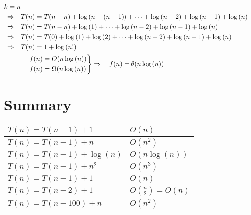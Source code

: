 \documentclass[12pt]{article}
\begin{document}
\begin{align*}
k = n \\
\Rightarrow \quad &T(n) =  T(n-n) + \log{(n-(n-1))} + \dots + \log{(n-2)} + \log{(n-1)} + \log{(n)} \\
\Rightarrow \quad &T(n) =  T(n-n) + \log{(1)} + \dots + \log{(n-2)} + \log{(n-1)} + \log{(n)} \\
\Rightarrow \quad &T(n) =  T(0) + \log{(1)} + \log{(2)} + \dots + \log{(n-2)} + \log{(n-1)} + \log{(n)} \\
\Rightarrow \quad &T(n) = 1 + \log{(n!)} \\
&\begin{rcases}
&f(n) = O(n\log{(n)}) \\
&f(n) = \Omega(n\log{(n)}) 
\end{rcases}
\Rightarrow \quad f(n) = \theta(n\log{(n)}) 
\end{align*}






\section{Summary}





\begin{center}
  \bgroup
  \def\arraystretch{1.5}%
  \begin{tabular}{ l | l  }
	$T(n) = T(n-1) + 1$
	&
	{ \Large  
	$O(n)$
	}
	\\ \hline
	$T(n) = T(n-1) + n$
	&
	{ \Large  
	$O(n^{2})$
	}
	\\ \hline
	$T(n) = T(n-1) + \log{(n)}$
	&
	{ \Large  
	$O(n\log{(n)})$
	}
	\\ \hline
	$T(n) = T(n-1) + n^{2}$
	&
	{ \Large  
	$O(n^{3})$
	}
	\\ \hline
	$T(n) = T(n-1) + 1$
	&
	{ \Large  
	$O(n)$
	}
	\\ \hline
	$T(n) = T(n-2) + 1$
	&
	{ \Large  
	$O(\frac{n}{2}) = O(n)$
	}
	\\ \hline
	$T(n) = T(n-100) + n$
	&
	{ \Large  
	$O(n^{2})$
	}
	\\ 
  \end{tabular}
  \egroup
\end{center}







\newpage
\end{document}
